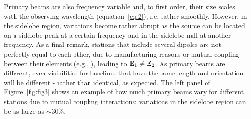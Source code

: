 \begin{itemize}
Primary beams are also frequency variable and, to first order, their size scales with the observing wavelength (equation~\ref{eq:2}), i.e. rather smoothly. However, in the sidelobe region, variations become rather abrupt as the source can be located on a sidelobe peak at a certain frequency and in the sidelobe null at another frequency. As a final remark, stations that include several dipoles are not perfectly equal to each other, due to manufacturing reasons or mutual coupling between their elements (e.g., \cite{sokolowski17}), leading to  ${\bf E}_1 \neq {\bf E}_2$. As primary beams are different, even visibilities for baselines that have the same length and orientation will be different - rather than identical, as expected. The left panel of Figure~\ref{fig:fig3} shows an example of how much primary beams vary for different stations due to mutual coupling interactions: variations in the sidelobe region can be as large as $\sim 30\%$.


\end{itemize}
